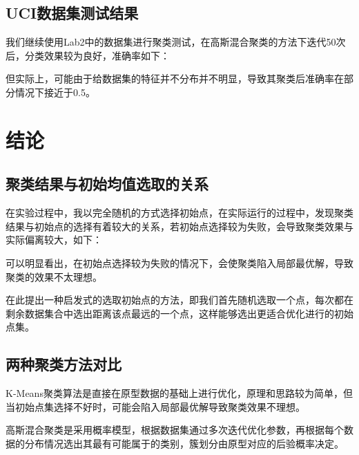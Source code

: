\documentclass[12pt]{article}
\begin{document}
\subsection{UCI数据集测试结果}
我们继续使用Lab2中的数据集进行聚类测试，在高斯混合聚类的方法下迭代50次后，分类效果较为良好，准确率如下：
\begin{figure}[H]
    \centering
\end{figure}
但实际上，可能由于给数据集的特征并不分布并不明显，导致其聚类后准确率在部分情况下接近于0.5。
\section{结论}
\subsection{聚类结果与初始均值选取的关系}
在实验过程中，我以完全随机的方式选择初始点，在实际运行的过程中，发现聚类结果与初始点的选择有着较大的关系，若初始点选择较为失败，会导致聚类效果与实际偏离较大，如下：
\begin{figure}[H]
    \centering
\end{figure}
可以明显看出，在初始点选择较为失败的情况下，会使聚类陷入局部最优解，导致聚类的效果不太理想。\par
在此提出一种启发式的选取初始点的方法，即我们首先随机选取一个点，每次都在剩余数据集合中选出距离该点最远的一个点，这样能够选出更适合优化进行的初始点集。\par
\subsection{两种聚类方法对比}
K-Means聚类算法是直接在原型数据的基础上进行优化，原理和思路较为简单，但当初始点集选择不好时，可能会陷入局部最优解导致聚类效果不理想。\par
高斯混合聚类是采用概率模型，根据数据集通过多次迭代优化参数，再根据每个数据的分布情况选出其最有可能属于的类别，簇划分由原型对应的后验概率决定。
\end{document}
